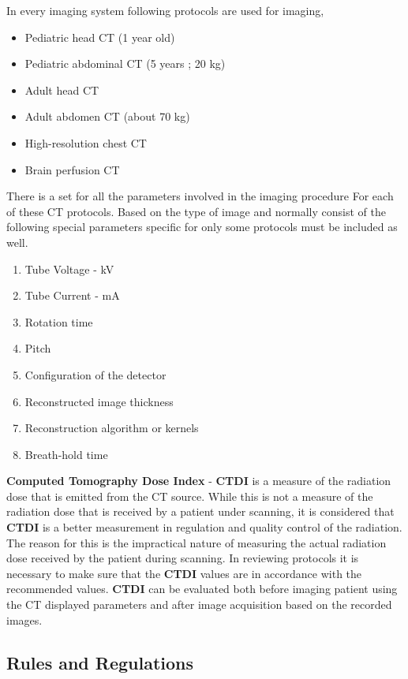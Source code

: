 \documentclass[12pt]{article}
\begin{document}
In every imaging system following protocols are used for imaging,
\begin{itemize}
    \item Pediatric head CT (1 year old)
    \item Pediatric abdominal CT (5 years ; 20 kg)
    \item Adult head CT
    \item Adult abdomen CT (about 70 kg)
    \item High-resolution chest CT
    \item Brain perfusion CT
\end{itemize}

There is a set for all the parameters involved in the imaging procedure For each of these CT protocols. Based on the type of image and normally consist of the following special parameters specific for only some protocols must be included as well.

\begin{enumerate}
    \item Tube Voltage - kV
    \item Tube Current - mA
    \item Rotation time
    \item Pitch
    \item Configuration of the detector
    \item Reconstructed image thickness
    \item Reconstruction algorithm or kernels
    \item Breath-hold time
    
\end{enumerate}

\textbf{Computed Tomography Dose Index} - \textbf{CTDI} is a measure of the radiation dose that is emitted from the CT source. While this is not a measure of the radiation dose that is received by a patient under scanning, it is considered that \textbf{CTDI} is a better measurement in regulation and quality control of the radiation. The reason for this is the impractical nature of measuring the actual radiation dose received by the patient during scanning. In reviewing protocols it is necessary to make sure that the \textbf{CTDI} values are in accordance with the recommended values. \textbf{CTDI} can be evaluated both before imaging patient using the CT displayed parameters and after image acquisition based on the recorded images.

\subsection{Rules and Regulations}
\end{document}
